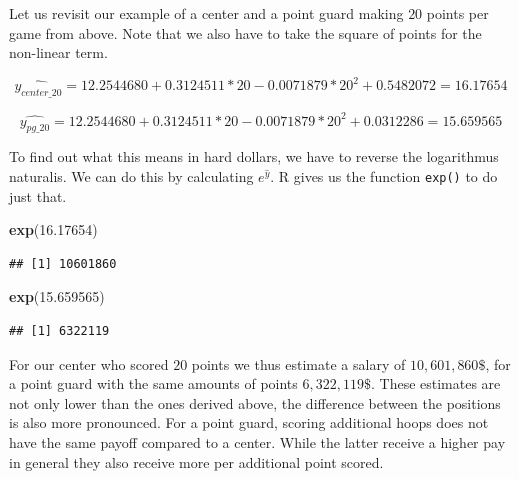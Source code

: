 \documentclass[
]{book}
\newenvironment{Shaded}{\begin{snugshade}}{\end{snugshade}}
\newcommand{\FloatTok}[1]{\textcolor[rgb]{0.00,0.00,0.81}{#1}}
\newcommand{\FunctionTok}[1]{\textcolor[rgb]{0.13,0.29,0.53}{\textbf{#1}}}
\newcommand{\NormalTok}[1]{#1}
\begin{document}
Let us revisit our example of a center and a point guard making \(20\) points
per game from above. Note that we also have to take the square of points for the
non-linear term.

\[\hat{y_{center\_20}} = 12.2544680 + 0.3124511 * 20 - 0.0071879 * 20^2 + 0.5482072 = 16.17654\]

\[\hat{y_{pg\_20}} = 12.2544680 + 0.3124511 * 20 - 0.0071879 * 20^2 + 0.0312286 = 15.659565\]

To find out what this means in hard dollars, we have to reverse the logarithmus
naturalis. We can do this by calculating \(e^{\hat{y}}\). R gives us the function
\texttt{exp()} to do just that.

\begin{Shaded}
\begin{Highlighting}[]
\FunctionTok{exp}\NormalTok{(}\FloatTok{16.17654}\NormalTok{)}
\end{Highlighting}
\end{Shaded}

\begin{verbatim}
## [1] 10601860
\end{verbatim}

\begin{Shaded}
\begin{Highlighting}[]
\FunctionTok{exp}\NormalTok{(}\FloatTok{15.659565}\NormalTok{)}
\end{Highlighting}
\end{Shaded}

\begin{verbatim}
## [1] 6322119
\end{verbatim}

For our center who scored \(20\) points we thus estimate a salary of
\(10,601,860\$\), for a point guard with the same amounts of points \(6,322,119\$\).
These estimates are not only lower than the ones derived above, the difference
between the positions is also more pronounced. For a point guard, scoring
additional hoops does not have the same payoff compared to a center. While the
latter receive a higher pay in general they also receive more per additional
point scored.
\end{document}
